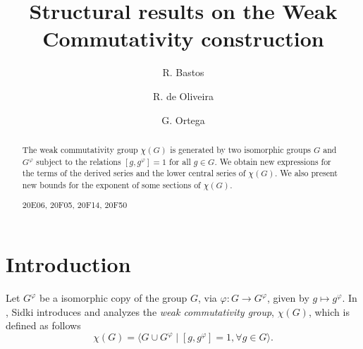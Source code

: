\documentclass[12pt,leqno]{amsart}
\begin{document}
\title[weak commutativity]{Structural results on the Weak Commutativity construction}
\author[Bastos]{R. Bastos}
\address{Departamento de Matem\'atica, Universidade de  Bras\'ilia,
Bras\'ilia-DF, 70910-900 Brazil \newline ORCID: https://orcid.org/0000-0002-5733-519X}
\author[de Oliveira]{R. de Oliveira}
\address{ Instituto de Matem\'atica e Estat\'istica, Universidade Federal de Goi\'as,
Goi\^ania-GO, 74690-900 Brazil \newline ORCID:https://orcid.org/0000-0003-3151-7304}
\author[Ortega]{G. Ortega}
\address{Departamento de Matem\'atica, Universidade de Bras\'ilia,
Bras\'ilia-DF, 70910-900 Brazil \newline ORCID:https://orcid.org/0009-0004-4895-0555}

\justify
\begin{abstract}
The weak commutativity group $\chi(G)$ is generated by two isomorphic groups $G$ and $G^{\varphi }$ subject to the relations $[g,g^{\varphi}]=1$ for all $g \in G$. We obtain new expressions for the terms of the derived series and the lower central series of $\chi(G)$. We also present new bounds for the exponent of some sections of $\chi(G)$. \vspace{0,3cm} 

 20E06, 20F05, 20F14, 20F50
\end{abstract}

\maketitle

\section{Introduction}

Let  $G^{\varphi}$ be a isomorphic copy of the group $G$, via $\varphi : G \rightarrow G^{\varphi}$, given by $g \mapsto g^{\varphi}$. In \cite{Sidki}, Sidki introduces and analyzes the {\it weak commutativity group}, $\chi(G)$, which is defined as follows \[ \chi(G) = \langle G \cup G^{\varphi} \mid [g,g^{\varphi}]=1, \forall g \in G \rangle.\]
\end{document}
